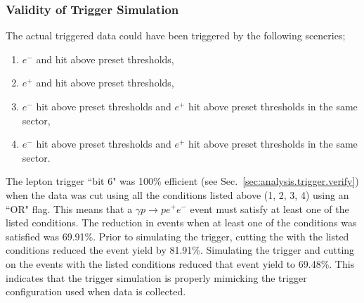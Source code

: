 \subsubsection{Validity of Trigger Simulation}
The actual triggered data could have been triggered by the following sceneries;
\begin{enumerate}\label{trig:get.all}
\item $e^-$  and  hit above preset thresholds,
\item $e^+$  and  hit above preset thresholds,
\item $e^-$  hit above preset thresholds and $e^+$  hit above preset thresholds in the same sector, 
\item $e^-$  hit above preset thresholds and $e^+$  hit above preset thresholds in the same sector. 
\end{enumerate}
The lepton trigger ``bit 6" was 100\% efficient (see Sec.~\ref{sec:analysis.trigger.verify}) when the data was cut using all the conditions listed above (1, 2, 3, 4) using an ``OR" flag. This means that a $\gamma p \to p e^+ e^-$ event must satisfy at least one of the listed conditions. The reduction in events when at least one of the conditions was satisfied was 69.91\%. Prior to simulating the trigger, cutting the  with the listed conditions reduced the event yield by 81.91\%. Simulating the trigger and cutting on the  events with the listed conditions reduced that event yield to 69.48\%. This indicates that the trigger simulation is properly mimicking the trigger configuration used when data is collected. 

%
%




